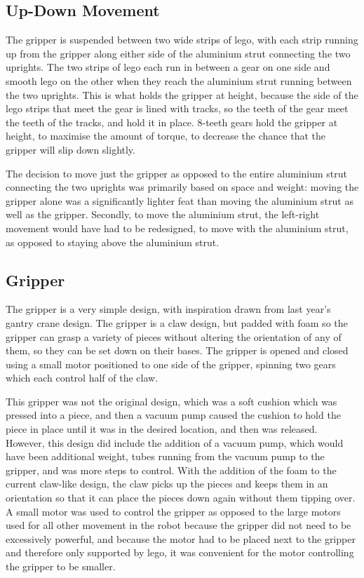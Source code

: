 \documentclass[onecolumn]{IEEEtran}
\begin{document}
\subsection{Up-Down Movement}
The gripper is suspended between two wide strips of lego, with each strip running up from the gripper along either side of the aluminium strut connecting the two uprights. The two strips of lego each run in between a gear on one side and smooth lego on the other when they reach the aluminium strut running between the two uprights. This is what holds the gripper at height, because the side of the lego strips that meet the gear is lined with tracks, so the teeth of the gear meet the teeth of the tracks, and hold it in place. 8-teeth gears hold the gripper at height, to maximise the amount of torque, to decrease the chance that the gripper will slip down slightly. \par
The decision to move just the gripper as opposed to the entire aluminium strut connecting the two uprights was primarily based on space and weight: moving the gripper alone was a significantly lighter feat than moving the aluminium strut as well as the gripper. Secondly, to move the aluminium strut, the left-right movement would have had to be redesigned, to move with the aluminium strut, as opposed to staying above the aluminium strut. \par
\subsection{Gripper}
The gripper is a very simple design, with inspiration drawn from last year's gantry crane design. The gripper is a claw design, but padded with foam so the gripper can grasp a variety of pieces without altering the orientation of any of them, so they can be set down on their bases. The gripper is opened and closed using a small motor positioned to one side of the gripper, spinning two gears which each control half of the claw. \par
This gripper was not the original design, which was a soft cushion which was pressed into a piece, and then a vacuum pump caused the cushion to hold the piece in place until it was in the desired location, and then was released. However, this design did include the addition of a vacuum pump, which would have been additional weight, tubes running from the vacuum pump to the gripper, and was more steps to control. With the addition of the foam to the current claw-like design, the claw picks up the pieces and keeps them in an orientation so that it can place the pieces down again without them tipping over. A small motor was used to control the gripper as opposed to the large motors used for all other movement in the robot because the gripper did not need to be excessively powerful, and because the motor had to be placed next to the gripper and therefore only supported by lego, it was convenient for the motor controlling the gripper to be smaller. \par
\end{document}
